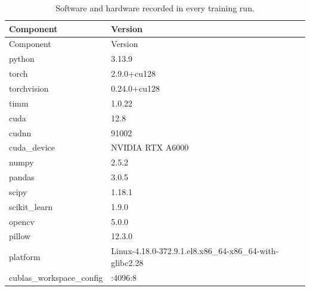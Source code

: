 {\footnotesize
\setlength{\tabcolsep}{3.5pt}
\begin{longtable}{lp{11cm}}
\caption{Software and hardware recorded in every training run.}\label{r:tab:software}\\
\toprule
Component & Version \\
\midrule
\endfirsthead
\toprule
Component & Version \\
\midrule
\endhead
\bottomrule
\endfoot
python & 3.13.9 \\
torch & 2.9.0+cu128 \\
torchvision & 0.24.0+cu128 \\
timm & 1.0.22 \\
cuda & 12.8 \\
cudnn & 91002 \\
cuda\_device & NVIDIA RTX A6000 \\
numpy & 2.5.2 \\
pandas & 3.0.5 \\
scipy & 1.18.1 \\
scikit\_learn & 1.9.0 \\
opencv & 5.0.0 \\
pillow & 12.3.0 \\
platform & Linux-4.18.0-372.9.1.el8.x86\_64-x86\_64-with-glibc2.28 \\
cublas\_workspace\_config & :4096:8 \\
\end{longtable}
}
